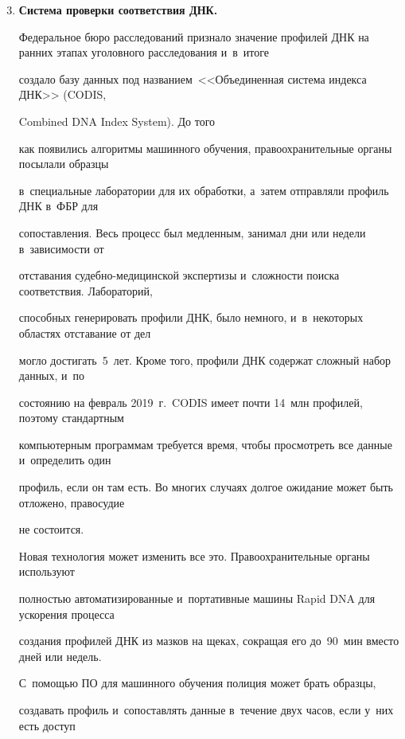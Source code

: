   \begin{enumerate}[1.]


  \setcounter{enumi}{2}


\item %


\textbf{Система проверки соответствия ДНК.}


Федеральное бюро расследований признало значение профилей ДНК на ранних этапах уголовного расследования и~в~итоге


создало базу данных под названием~<<Объединенная сис\-те\-ма индекса ДНК>> (CODIS,


Combined DNA Index System). До того


как появились алгоритмы машинного обучения, правоохранительные органы посылали образцы


в~специальные лаборатории для их обработки, а~затем отправляли профиль ДНК в~ФБР для


сопоставления. Весь процесс был медленным, занимал дни или недели в~зависимости от


отставания су\-деб\-но-ме\-ди\-цин\-ской экспертизы и~слож\-ности поиска соответствия. Лабораторий,


способных генерировать профили ДНК, было немного, и~в~некоторых областях отставание от дел


могло достигать~5~лет. Кроме того, профили ДНК содержат сложный набор данных, и~по


состоянию на февраль 2019~г.\ CODIS имеет почти 14~млн профилей, поэтому стандартным


компьютерным программам требуется время, чтобы просмотреть все данные и~определить один


профиль, если он там есть. Во многих случаях долгое ожидание может быть отложено, правосудие


не состоится. 







Новая технология может изменить все это. Правоохранительные органы используют


полностью автоматизированные и~портативные машины Rapid DNA для ускорения процесса


создания профилей ДНК из мазков на щеках, сокращая его до~90~мин вместо дней или недель.


С~по\-мощью ПО для машинного обучения полиция может брать образцы,


создавать профиль и~сопоставлять данные в~течение двух часов, если у~них есть доступ



\end{enumerate}
